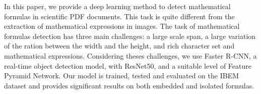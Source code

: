 In this paper, we provide a deep learning method to detect mathematical formulas in scientific PDF documents. This task is quite different from the extraction of mathematical expressions in images. The task of mathematical formulas detection has three main challenges: a large scale span, a large variation of the ration between the width and the height, and rich character set and mathematical expressions. Considering theses challenges, we use Faster R-CNN, a real-time object detection model, with ResNet50, and a suitable level of Feature Pyramid Network. Our model is trained, tested and evaluated on the IBEM dataset and provides significant results on both embedded and isolated formulas.